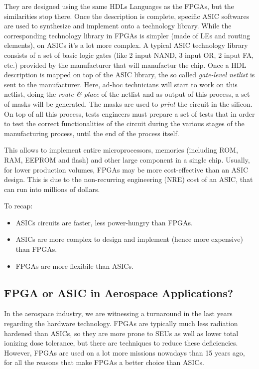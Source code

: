 They are designed using the same HDLs Languages as the FPGAs, but the similarities stop there. Once the description is complete, specific ASIC softwares are used to synthesize and implement onto a technology library. While the corresponding technology library in FPGAs is simpler (made of LEs and routing elements), on ASICs it's a lot more complex. A typical ASIC technology library consists of a set of basic logic gates (like 2 input NAND, 3 input OR, 2 input FA, etc.) provided by the manufacturer that will manufactur the chip. Once a HDL description is mapped on top of the ASIC library, the so called \textit{gate-level netlist} is sent to the manufacturer. Here, ad-hoc technicians will start to work on this netlist, doing the \textit{route \& place} of the netlist and as output of this process, a set of masks will be generated. The masks are used to \textit{print} the circuit in the silicon. On top of all this process, tests engineers must prepare a set of tests that in order to test the correct functionalities of the circuit during the various stages of the manufacturing process, until the end of the process itself. \bigskip

This allows to implement entire microprocessors, memories (including ROM, RAM, EEPROM and flash) and other large component in a single chip. Usually, for lower production volumes, FPGAs may be more cost-effective than an ASIC design. This is due to the non-recurring engineering (NRE) cost of an ASIC, that can run into millions of dollars. \bigskip

To recap:
\begin{itemize}
    \item ASICs circuits are faster, less power-hungry than FPGAs.
    \item ASICs are more complex to design and implement (hence more expensive) than FPGAs.
    \item FPGAs are more flexibile than ASICs.
\end{itemize}


\subsection{FPGA or ASIC in Aerospace Applications?}

In the aerospace industry, we are witnessing a turnaround in the last years regarding the hardware technology. FPGAs are typically much less radiation hardened than ASICs, so they are more prone to SEUs as well as lower total ionizing dose tolerance, but there are techniques to reduce these deficiencies. However, FPGAs are used on a lot more missions nowadays than 15 years ago, for all the reasons that make FPGAs a better choice than ASICs.\bigskip

